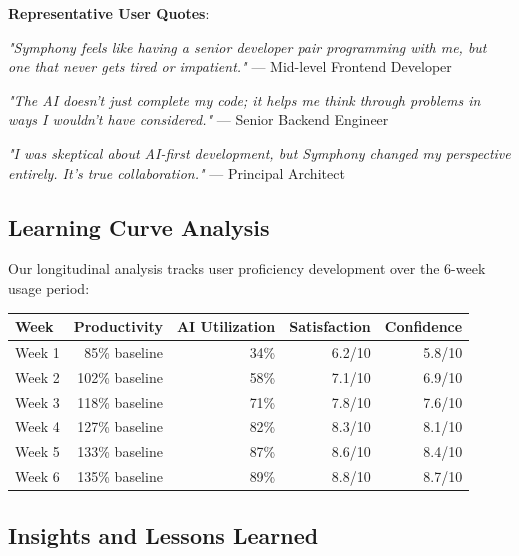 \textbf{Representative User Quotes}:

\begin{compactlist}
    \item \textit{"Symphony feels like having a senior developer pair programming with me, but one that never gets tired or impatient."} — Mid-level Frontend Developer
    \item \textit{"The AI doesn't just complete my code; it helps me think through problems in ways I wouldn't have considered."} — Senior Backend Engineer
    \item \textit{"I was skeptical about AI-first development, but Symphony changed my perspective entirely. It's true collaboration."} — Principal Architect
\end{compactlist}

\subsection*{Learning Curve Analysis}

Our longitudinal analysis tracks user proficiency development over the 6-week usage period:

\begin{center}
\begin{tabular}{@{}lrrrr@{}}
\toprule
\textbf{Week} & \textbf{Productivity} & \textbf{AI Utilization} & \textbf{Satisfaction} & \textbf{Confidence} \\
\midrule
Week 1 & 85\% baseline & 34\% & 6.2/10 & 5.8/10 \\
Week 2 & 102\% baseline & 58\% & 7.1/10 & 6.9/10 \\
Week 3 & 118\% baseline & 71\% & 7.8/10 & 7.6/10 \\
Week 4 & 127\% baseline & 82\% & 8.3/10 & 8.1/10 \\
Week 5 & 133\% baseline & 87\% & 8.6/10 & 8.4/10 \\
Week 6 & 135\% baseline & 89\% & 8.8/10 & 8.7/10 \\
\bottomrule
\end{tabular}
\end{center}

\subsection*{Insights and Lessons Learned}


